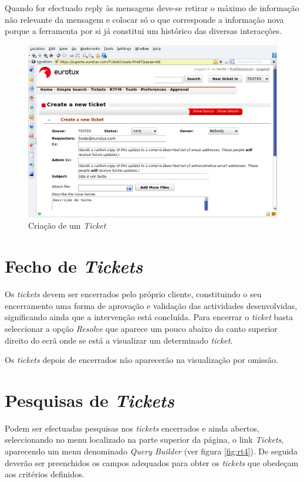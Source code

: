 Quando for efectuado reply às mensagens deve-se retirar o máximo de informação não relevante da mensagem e colocar só o que corresponde a informação nova porque a ferramenta por si já constitui um histórico das diversas interacções.


\begin{figure}[H]
\begin{center}
\includegraphics[width=16cm]{include/img/rt3}
\end{center}
\caption{Criação de um \emph{Ticket}}
\label{fig:rt3}
\end{figure}

\section{Fecho de \emph{Tickets}}
Os \emph{tickets} devem ser encerrados pelo próprio cliente, constituindo o seu encerramento uma forma de aprovação e validação das actividades desenvolvidas, significando ainda que a intervenção está concluída. Para encerrar o \emph{ticket} basta seleccionar a opção \emph{Resolve} que aparece um pouco abaixo do canto superior direito do ecrã onde se está a visualizar um determinado \emph{ticket}.

Os \emph{tickets} depois de encerrados não aparecerão na visualização por omissão.

\section{Pesquisas de \emph{Tickets}}
Podem ser efectuadas pesquisas nos \emph{tickets} encerrados e ainda abertos, seleccionando no menu localizado na parte superior da página, o link \emph{Tickets}, aparecendo um menu denominado \emph{Query Builder} (ver figura \ref{fig:rt4}). De seguida deverão ser preenchidos os campos adequados para obter os \emph{tickets} que obedeçam aos critérios definidos.

